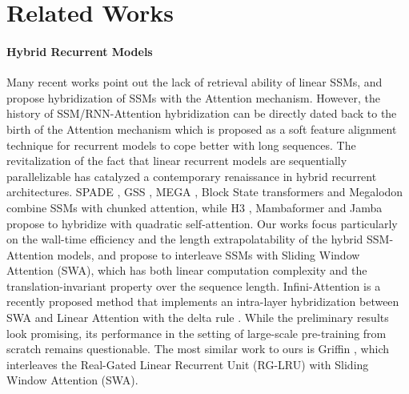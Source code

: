 \documentclass{article}
\begin{document}
\medskip


{
\small



% 

}

\appendix

\section{Related Works} \label{rel}
\paragraph{Hybrid Recurrent Models} Many recent works \citep{park2024mamba,jelassi2024repeat,akyürek2024incontext} point out the lack of retrieval ability of linear SSMs, and propose hybridization of SSMs with the Attention mechanism. However, the history of SSM/RNN-Attention hybridization can be directly dated back to the birth of the Attention mechanism \citep{bahdanau2014neural} which is proposed as a soft feature alignment technique for recurrent models to cope better with long sequences. The revitalization of the fact that linear recurrent models are sequentially parallelizable \citep{parallrnn,gu2021efficiently} has catalyzed a contemporary renaissance in hybrid recurrent architectures. SPADE \citep{zuo2022efficient}, GSS \citep{gss}, MEGA \citep{mega}, Block State transformers \citep{fathi2023blockstate} and Megalodon \citep{ma2024megalodon} combine SSMs with chunked attention, while H3 \citep{dao2022hungry}, Mambaformer \citep{park2024mamba} and Jamba \citep{lieber2024jamba,team2024jamba15} propose to hybridize with quadratic self-attention. Our works focus particularly on the wall-time efficiency and the length extrapolatability of the hybrid SSM-Attention models, and propose to interleave SSMs with Sliding Window Attention (SWA), which has both linear computation complexity and the translation-invariant property over the sequence length. Infini-Attention \citep{munkhdalai2024leave} is a recently proposed method that implements an intra-layer hybridization \citep{wu2022memorizing} between SWA and Linear Attention with the delta rule \citep{fastweight}. While the preliminary results look promising, its performance in the setting of large-scale pre-training from scratch remains questionable. The most similar work to ours is Griffin \citep{de2024griffin}, which interleaves the Real-Gated Linear Recurrent Unit (RG-LRU) with Sliding Window Attention (SWA).
\end{document}
